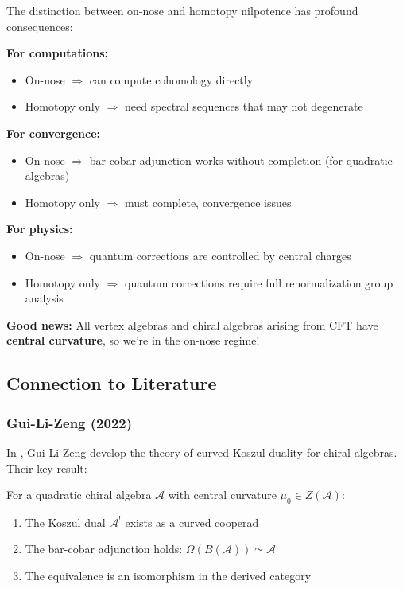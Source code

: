 \begin{remark}\label{rem:why-on-nose-matters}
The distinction between on-nose and homotopy nilpotence has profound consequences:

\textbf{For computations:}
\begin{itemize}
\item On-nose $\Rightarrow$ can compute cohomology directly
\item Homotopy only $\Rightarrow$ need spectral sequences that may not degenerate
\end{itemize}

\textbf{For convergence:}
\begin{itemize}
\item On-nose $\Rightarrow$ bar-cobar adjunction works without completion (for quadratic algebras)
\item Homotopy only $\Rightarrow$ must complete, convergence issues
\end{itemize}

\textbf{For physics:}
\begin{itemize}
\item On-nose $\Rightarrow$ quantum corrections are controlled by central charges
\item Homotopy only $\Rightarrow$ quantum corrections require full renormalization group analysis
\end{itemize}

\textbf{Good news:} All vertex algebras and chiral algebras arising from CFT have 
\textbf{central curvature}, so we're in the on-nose regime!
\end{remark}

\subsection{Connection to Literature}

\subsubsection{Gui-Li-Zeng (2022)}

In \cite{GLZ22}, Gui-Li-Zeng develop the theory of curved Koszul duality for chiral algebras. 
Their key result:

\begin{theorem}\label{thm:glz-curved}
For a quadratic chiral algebra $\mathcal{A}$ with central curvature $\mu_0 \in Z(\mathcal{A})$:
\begin{enumerate}
\item The Koszul dual $\mathcal{A}^!$ exists as a curved cooperad
\item The bar-cobar adjunction holds: $\Omega(B(\mathcal{A})) \simeq \mathcal{A}$
\item The equivalence is an isomorphism in the derived category
\end{enumerate}
\end{theorem}

